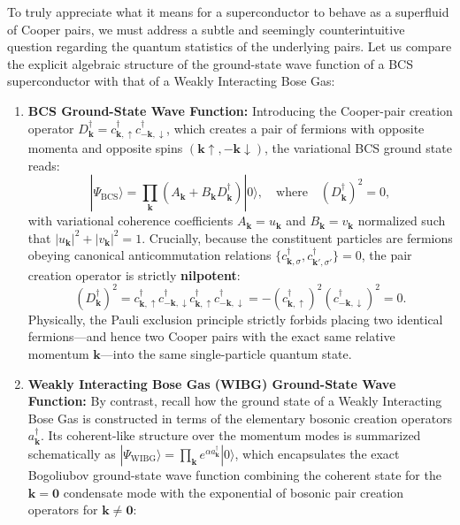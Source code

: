To truly appreciate what it means for a superconductor to behave as a superfluid of Cooper pairs, we must address a subtle and seemingly counterintuitive question regarding the quantum statistics of the underlying pairs. Let us compare the explicit algebraic structure of the ground-state wave function of a BCS superconductor with that of a Weakly Interacting Bose Gas:
\begin{enumerate}
    \item \textbf{BCS Ground-State Wave Function:} Introducing the Cooper-pair creation operator \( D_{\mathbf{k}}^\dagger = c_{\mathbf{k},\uparrow}^\dagger c_{-\mathbf{k},\downarrow}^\dagger \), which creates a pair of fermions with opposite momenta and opposite spins \( (\mathbf{k}\uparrow, -\mathbf{k}\downarrow) \), the variational BCS ground state reads:
          \begin{equation} \label{eq:bcs_ground_state_pair_operator}
              |\Psi_{\text{BCS}}\rangle = \prod_{\mathbf{k}} \left( A_{\mathbf{k}} + B_{\mathbf{k}} D_{\mathbf{k}}^\dagger \right) |0\rangle, \quad \text{where} \quad \left( D_{\mathbf{k}}^\dagger \right)^2 = 0,
          \end{equation}
          with variational coherence coefficients \( A_{\mathbf{k}} = u_{\mathbf{k}} \) and \( B_{\mathbf{k}} = v_{\mathbf{k}} \) normalized such that \( |u_{\mathbf{k}}|^2 + |v_{\mathbf{k}}|^2 = 1 \). Crucially, because the constituent particles are fermions obeying canonical anticommutation relations \( \{c_{\mathbf{k},\sigma}^\dagger, c_{\mathbf{k}',\sigma'}^\dagger\} = 0 \), the pair creation operator is strictly \textbf{nilpotent}:
          \[
              \left( D_{\mathbf{k}}^\dagger \right)^2 = c_{\mathbf{k},\uparrow}^\dagger c_{-\mathbf{k},\downarrow}^\dagger c_{\mathbf{k},\uparrow}^\dagger c_{-\mathbf{k},\downarrow}^\dagger = - \left( c_{\mathbf{k},\uparrow}^\dagger \right)^2 \left( c_{-\mathbf{k},\downarrow}^\dagger \right)^2 = 0.
          \]
          Physically, the Pauli exclusion principle strictly forbids placing two identical fermions—and hence two Cooper pairs with the exact same relative momentum \( \mathbf{k} \)—into the same single-particle quantum state.
    \item \textbf{Weakly Interacting Bose Gas (WIBG) Ground-State Wave Function:} By contrast, recall how the ground state of a Weakly Interacting Bose Gas is constructed in terms of the elementary bosonic creation operators \( a_{\mathbf{k}}^\dagger \). Its coherent-like structure over the momentum modes is summarized schematically as \( |\Psi_{\text{WIBG}}\rangle = \prod_{\mathbf{k}} e^{\alpha a_{\mathbf{k}}^\dagger} |0\rangle \), which encapsulates the exact Bogoliubov ground-state wave function combining the coherent state for the \( \mathbf{k} = \mathbf{0} \) condensate mode with the exponential of bosonic pair creation operators for \( \mathbf{k} \neq \mathbf{0} \):

\end{enumerate}
